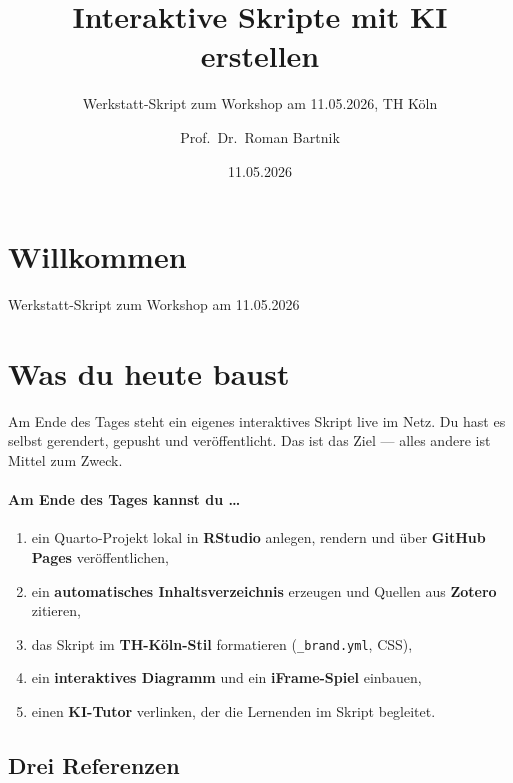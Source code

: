 \documentclass[
  ngerman,
  a4paper,
  DIV=11]{scrreprt}
\title{Interaktive Skripte mit KI erstellen}
\subtitle{Werkstatt-Skript zum Workshop am 11.05.2026, TH Köln}
\author{Prof.~Dr.~Roman Bartnik}
\date{11.05.2026}
\providecommand{\tightlist}{%
  \setlength{\itemsep}{0pt}\setlength{\parskip}{0pt}}
\renewcommand*\contentsname{Inhaltsverzeichnis}
\newcommand\contentsname{Inhaltsverzeichnis}
\begin{document}
\maketitle

\renewcommand*\contentsname{Inhaltsverzeichnis}
{
\hypersetup{linkcolor=}
\setcounter{tocdepth}{2}
\tableofcontents
}


\chapter{Willkommen}\label{willkommen}

Werkstatt-Skript zum Workshop am 11.05.2026

\hfill\break


\chapter{Was du heute baust}\label{was-du-heute-baust}

Am Ende des Tages steht ein eigenes interaktives Skript live im Netz. Du
hast es selbst gerendert, gepusht und veröffentlicht. Das ist das Ziel
--- alles andere ist Mittel zum Zweck.

\subsubsection{Am Ende des Tages kannst du
\ldots{}}\label{am-ende-des-tages-kannst-du}

\begin{enumerate}
\def\labelenumi{\arabic{enumi}.}
\tightlist
\item
  ein Quarto-Projekt lokal in \textbf{RStudio} anlegen, rendern und über
  \textbf{GitHub Pages} veröffentlichen,
\item
  ein \textbf{automatisches Inhaltsverzeichnis} erzeugen und Quellen aus
  \textbf{Zotero} zitieren,
\item
  das Skript im \textbf{TH-Köln-Stil} formatieren (\texttt{\_brand.yml},
  CSS),
\item
  ein \textbf{interaktives Diagramm} und ein \textbf{iFrame-Spiel}
  einbauen,
\item
  einen \textbf{KI-Tutor} verlinken, der die Lernenden im Skript
  begleitet.
\end{enumerate}

\section{Drei Referenzen}\label{drei-referenzen}
\end{document}
